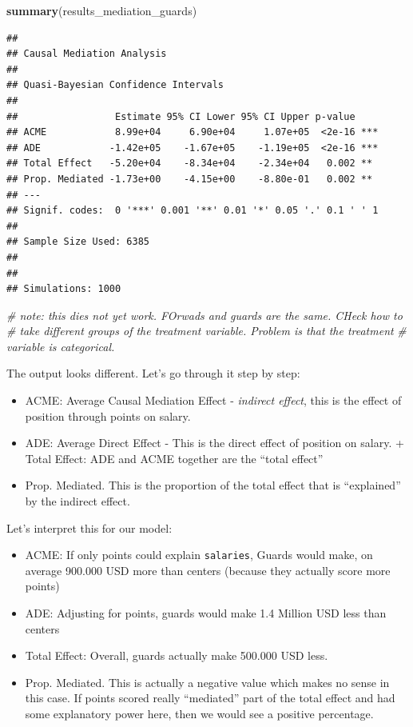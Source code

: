 \documentclass[
]{book}
\newenvironment{Shaded}{\begin{snugshade}}{\end{snugshade}}
\newcommand{\CommentTok}[1]{\textcolor[rgb]{0.56,0.35,0.01}{\textit{#1}}}
\newcommand{\FunctionTok}[1]{\textcolor[rgb]{0.13,0.29,0.53}{\textbf{#1}}}
\newcommand{\NormalTok}[1]{#1}
\providecommand{\tightlist}{%
  \setlength{\itemsep}{0pt}\setlength{\parskip}{0pt}}
\begin{document}
\begin{Shaded}
\begin{Highlighting}[]
\FunctionTok{summary}\NormalTok{(results\_mediation\_guards)}
\end{Highlighting}
\end{Shaded}

\begin{verbatim}
## 
## Causal Mediation Analysis 
## 
## Quasi-Bayesian Confidence Intervals
## 
##                 Estimate 95% CI Lower 95% CI Upper p-value    
## ACME            8.99e+04     6.90e+04     1.07e+05  <2e-16 ***
## ADE            -1.42e+05    -1.67e+05    -1.19e+05  <2e-16 ***
## Total Effect   -5.20e+04    -8.34e+04    -2.34e+04   0.002 ** 
## Prop. Mediated -1.73e+00    -4.15e+00    -8.80e-01   0.002 ** 
## ---
## Signif. codes:  0 '***' 0.001 '**' 0.01 '*' 0.05 '.' 0.1 ' ' 1
## 
## Sample Size Used: 6385 
## 
## 
## Simulations: 1000
\end{verbatim}

\begin{Shaded}
\begin{Highlighting}[]
\CommentTok{\# note: this dies not yet work. FOrwads and guards are the same. CHeck how to }
\CommentTok{\# take different groups of the treatment variable. Problem is that the treatment}
\CommentTok{\# variable is categorical.}
\end{Highlighting}
\end{Shaded}

The output looks different. Let's go through it step by step:

\begin{itemize}
\tightlist
\item
  ACME: Average Causal Mediation Effect - \emph{indirect effect}, this is the effect of position through points on salary.\\
\item
  ADE: Average Direct Effect - This is the direct effect of position on salary. + Total Effect: ADE and ACME together are the ``total effect''\\
\item
  Prop. Mediated. This is the proportion of the total effect that is ``explained'' by the indirect effect.
\end{itemize}

Let's interpret this for our model:

\begin{itemize}
\tightlist
\item
  ACME: If only points could explain \texttt{salaries}, Guards would make, on average 900.000 USD more than centers (because they actually score more points)
\item
  ADE: Adjusting for points, guards would make 1.4 Million USD less than centers
\item
  Total Effect: Overall, guards actually make 500.000 USD less.
\item
  Prop. Mediated. This is actually a negative value which makes no sense in this case. If points scored really ``mediated'' part of the total effect and had some explanatory power here, then we would see a positive percentage.
\end{itemize}
\end{document}
